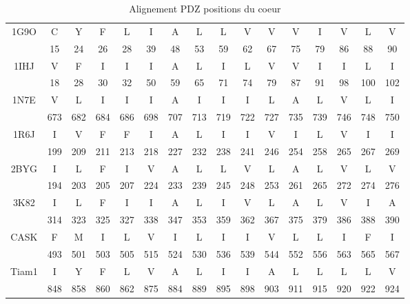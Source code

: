     \begin{table}[!htbp]
      \centering

     \caption{Alignement PDZ positions du coeur}   

      \begin{tabular}{cccccccccccccccc}

        \toprule

        \cmidrule{1-16}
   
          
1G9O & C & Y & F & L & I & A & L & L & V & V & V & I & V & L & V \\
     & 15 & 24 & 26 & 28 & 39 & 48 & 53 & 59 & 62 & 67 & 75 & 79 & 86 & 88 & 90 \\ 
1IHJ & V & F & I & I & I & A & L & I & L & V & V & I & I & L & I \\ 
     & 18 & 28 & 30 & 32 & 50 & 59 & 65 & 71 & 74 & 79 & 87 & 91 & 98 & 100 & 102 \\ 
1N7E & V & L & I & I & I & A & I & I & I & L & A & L & V & L & I \\
     & 673 & 682 & 684 & 686 & 698 & 707 & 713 & 719 & 722 & 727 & 735 & 739 & 746 & 748 & 750 \\ 
1R6J & I & V & F & F & I & A & L & I & I & V & I & L & V & I & I \\ 
     & 199 & 209 & 211 & 213 & 218 & 227 & 232 & 238 & 241 & 246 & 254 & 258 & 265 & 267 & 269 \\ 
2BYG & I & L & F & I & V & A & L & L & V & L & A & L & V & L & V \\ 
     & 194 & 203 & 205 & 207 & 224 & 233 & 239 & 245 & 248 & 253 & 261 & 265 & 272 & 274 & 276 \\ 
3K82 & I & L & F & I & I & A & L & I & V & L & A & L & V & I & A \\ 
     & 314 & 323 & 325 & 327 & 338 & 347 & 353 & 359 & 362 & 367 & 375 & 379 & 386 & 388 & 390 \\ 
CASK & F & M & I & L & V & I & L & I & I & V & L & L & I & F & I \\ 
     & 493 & 501 & 503 & 505 & 515 & 524 & 530 & 536 & 539 & 544 & 552 & 556 & 563 & 565 & 567 \\ 
Tiam1 & I & Y & F & L & V & A & L & I & I & A & L & L & L & L & V \\ 
      & 848 & 858 & 860 & 862 & 875 & 884 & 889 & 895 & 898 & 903 & 911 & 915 & 920 & 922 & 924 \\
          
   \bottomrule


   \end{tabular}     
\label{tab:corePDZ}      
    \end{table}



